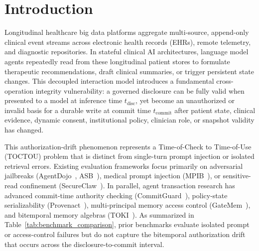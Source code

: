 \documentclass[conference]{IEEEtran}
\begin{document}
\section{Introduction}
Longitudinal healthcare big data platforms aggregate multi-source, append-only clinical event streams across electronic health records (EHRs), remote telemetry, and diagnostic repositories. In stateful clinical AI architectures, language model agents repeatedly read from these longitudinal patient stores to formulate therapeutic recommendations, draft clinical summaries, or trigger persistent state changes. This decoupled interaction model introduces a fundamental cross-operation integrity vulnerability: a governed disclosure can be fully valid when presented to a model at inference time $t_{\text{disc}}$, yet become an unauthorized or invalid basis for a durable write at commit time $t_{\text{commit}}$ after patient state, clinical evidence, dynamic consent, institutional policy, clinician role, or snapshot validity has changed.

This authorization-drift phenomenon represents a Time-of-Check to Time-of-Use (TOCTOU) problem that is distinct from single-turn prompt injection or isolated retrieval errors. Existing evaluation frameworks focus primarily on adversarial jailbreaks (AgentDojo~\cite{agentdojo}, ASB~\cite{asb}), medical prompt injection (MPIB~\cite{mpib}), or sensitive-read confinement (SecureClaw~\cite{secureclaw}). In parallel, agent transaction research has advanced commit-time authority checking (CommitGuard~\cite{commitguard}), policy-state serializability (Provenact~\cite{provenact}), multi-principal memory access control (GateMem~\cite{gatemem}), and bitemporal memory algebras (TOKI~\cite{toki}). As summarized in Table~\ref{tab:benchmark_comparison}, prior benchmarks evaluate isolated prompt or access-control failures but do not capture the bitemporal authorization drift that occurs across the disclosure-to-commit interval.
\end{document}
